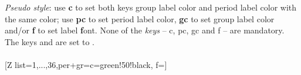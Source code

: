 \\ [10pt]\makebox[\linewidth][c]{\scalebox{.6}{\pgfPT[Z list={1,...,36},gr={per=false,c=green!50!black}]}}%
\\ [0pt]\pgfPTendstyle%
\label{style_per+gr}%
%
{\textit{Pseudo style}: use \textbf{c} to set both keys group label color and period label color with the same color; use \textbf{pc} to set period label color, \textbf{gc} to set group label color and/or \textbf{f } to set label \textbf{f}ont. None of the \textit{keys} -- c, pc, gc and f -- are mandatory.
The keys  and  are set to .
\\ [3pt]%
}%
\\ [5pt][Z list={1,...,36},per+gr={c=green!50!black, f=\string{}\string\selectfont\string\normalsize\string\bfseries}]%
\\ [10pt]\makebox[\linewidth][c]{\scalebox{.6}{\pgfPT[Z list={1,...,36},per+gr={c=green!50!black,f=\fontfamily{frc}\selectfont\normalsize\bfseries}]}}%
\\ [0pt]\pgfPTendstyle%
\endinput
